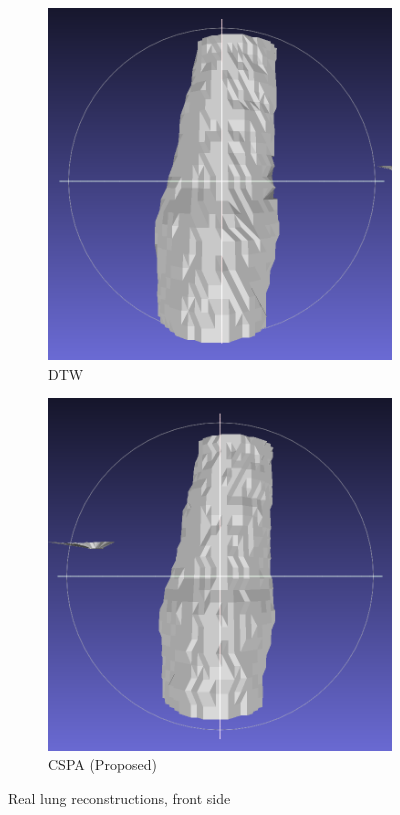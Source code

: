 \documentclass[11p, titlepage]{article}
\begin{document}
\begin{figure}[h!]
     \centering
     \begin{subfigure}[b]{0.45\textwidth}
         \centering
         \includegraphics[width=\textwidth]{reconstructions/dtw-real}
         \caption{DTW}
         \label{fig:dtw_real}
     \end{subfigure}
     \hfill
     \begin{subfigure}[b]{0.45\textwidth}
         \centering
         \includegraphics[width=\textwidth]{reconstructions/cspa50-real}
         \caption{CSPA (Proposed)}
         \label{fig:cspa50_real}
     \end{subfigure}
        \caption{Real lung reconstructions, front side}
        \label{fig:real_reconstructions}
\end{figure}
\end{document}
